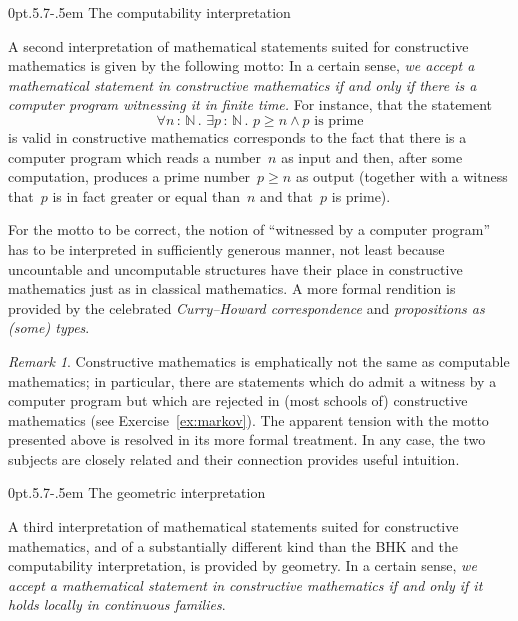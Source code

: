 \documentclass[10pt,reqno,a4paper,openany]{amsbook}
\makeatletter
\theoremstyle{definition}
\theoremstyle{plain}
\theoremstyle{remark}
\newtheorem{rem}[defn]{Remark}
\newcommand{\NN}{\mathbb{N}}
\newcommand{\?}{\,{:}\,}
\renewcommand{\_}{\mathpunct{.}\,}
\def\subsection{\@startsection{subsection}{2}%
  {0pt}{.5\linespacing\@plus.7\linespacing}{-.5em}%
  {\normalfont\bfseries}}
\makeatother
\begin{document}
\subsection{The computability interpretation}

A second interpretation of mathematical statements suited for constructive
mathematics is given by the following motto: In a certain sense, \emph{we
accept a mathematical statement in constructive mathematics if and only if
there is a computer program witnessing it in finite time.} For instance, that
the statement
\[ \forall n \? \NN\_ \exists p \? \NN\_ p \geq n \wedge \text{$p$ is prime} \]
is valid in constructive mathematics corresponds to the fact that there is a
computer program which reads a number~$n$ as input and then, after some
computation, produces a prime number~$p \geq n$ as output (together with a
witness that~$p$ is in fact greater or equal than~$n$ and that~$p$ is prime).

For the motto to be correct, the notion of ``witnessed by a computer program''
has to be interpreted in sufficiently generous manner, not least because
uncountable and uncomputable structures have their place in constructive
mathematics just as in classical mathematics. A more formal rendition is
provided by the celebrated \emph{Curry--Howard correspondence} and
\emph{propositions as (some) types}.

\begin{rem}Constructive mathematics is emphatically not the same as computable
mathematics; in particular, there are statements which do admit a witness by a
computer program but which are rejected in (most schools of) constructive
mathematics (see Exercise~\ref{ex:markov}). The apparent tension with the motto
presented above is resolved in its more formal treatment. In any case, the two
subjects are closely related and their connection provides useful
intuition.\end{rem}


\subsection{The geometric interpretation}

A third interpretation of mathematical statements suited for constructive
mathematics, and of a substantially different kind than the BHK and the
computability interpretation, is provided by geometry. In a certain sense,
\emph{we accept a mathematical statement in constructive mathematics if and
only if it holds locally in continuous families}.
\end{document}
